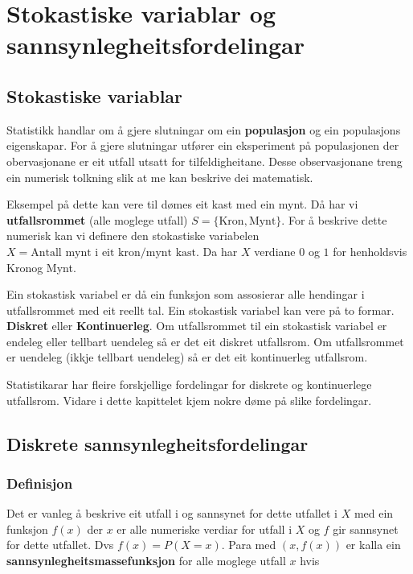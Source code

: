\chapter{Stokastiske variablar og sannsynlegheitsfordelingar}

\section{Stokastiske variablar}
Statistikk handlar om å gjere slutningar om ein \textbf{populasjon} og ein populasjons eigenskapar. For å gjere slutningar utfører ein eksperiment på populasjonen der obervasjonane er eit utfall utsatt for tilfeldigheitane. Desse observasjonane treng ein numerisk tolkning slik at me kan beskrive dei matematisk. 

Eksempel på dette kan vere til dømes eit kast med ein mynt. Då har vi \textbf{utfallsrommet} (alle moglege utfall) $S = \{\text{Kron}, \text{Mynt}\}$. For å beskrive dette numerisk kan vi definere den stokastiske variabelen $X = \text{Antall mynt i eit kron/mynt kast}$. Da har $X$ verdiane $0$ og $1$  for henholdsvis \startsitat Kron\sluttsitat og \startsitat Mynt\sluttsitat.

Ein stokastisk variabel er då ein funksjon som assosierar alle hendingar i utfallsrommet med eit reellt tal. Ein stokastisk variabel kan vere på to formar. \textbf{Diskret} eller \textbf{Kontinuerleg}. Om utfallsrommet til ein stokastisk variabel er endeleg eller tellbart uendeleg så er det eit diskret utfallsrom. Om utfallsrommet er uendeleg (ikkje tellbart uendeleg) så er det eit kontinuerleg utfallsrom.

Statistikarar har fleire forskjellige fordelingar for diskrete og kontinuerlege utfallsrom. Vidare i dette kapittelet kjem nokre døme på slike fordelingar.

\section{Diskrete sannsynlegheitsfordelingar}

\subsection{Definisjon}
Det er vanleg å beskrive eit utfall i og sannsynet for dette utfallet i $X$ med ein funksjon $f(x)$ der $x$  er alle numeriske verdiar for utfall i $X$ og $f$ gir sannsynet for dette utfallet. Dvs $f(x) = P(X = x)$. Para med $(x, f(x))$ er kalla ein \textbf{sannsynlegheitsmassefunksjon} for alle moglege utfall $x$ hvis

